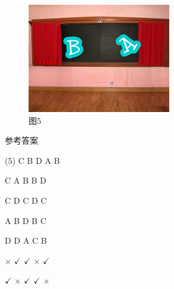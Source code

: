 \documentclass[10.5pt, a4paper]{article}
\begin{document}
\begin{enumerate}
\begin{figure}[htbp]
\begin{minipage}[t]{.18\textwidth}
                \includegraphics[width=\textwidth]{37-5.png}
                \caption*{图5}
            \end{minipage}
        \end{figure}
    \end{enumerate}

    \newpage
    \begin{center}
        \Huge \heiti 参考答案
    \end{center}

        \begin{tasks}[label=\arabic*.](5)
            \task C
            \task B
            \task D
            \task A
            \task B

            \task C
            \task A
            \task B
            \task B
            \task D

            \task C
            \task D
            \task C
            \task D
            \task C

            \task A
            \task B
            \task D
            \task B
            \task C

            \task D
            \task D
            \task A
            \task C
            \task B

            \task $\times$
            \task $\checkmark$
            \task $\checkmark$
            \task $\times$
            \task $\checkmark$

            \task $\checkmark$
            \task $\times$
            \task $\checkmark$
            \task $\checkmark$
            \task $\times$
        \end{tasks}
\end{document}
